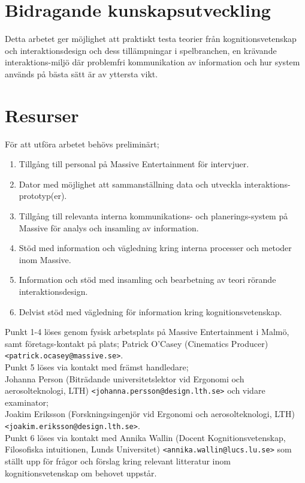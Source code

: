 \documentclass{article}
\begin{document}
\section*{Bidragande kunskapsutveckling}

  Detta arbetet ger möjlighet att praktiskt testa teorier från
  kognitionsvetenskap och interaktionsdesign och dess tillämpningar i
  spelbranchen, en krävande interaktions-miljö där problemfri kommunikation av
  information och hur system används på bästa sätt är av yttersta vikt.

\section*{Resurser}

  För att utföra arbetet behövs preliminärt;
  \begin{enumerate}
    \item{Tillgång till personal på Massive Entertainment för intervjuer.}
    \item{Dator med möjlighet att sammanställning data och utveckla
        interaktions-prototyp(er).}
    \item{Tillgång till relevanta interna kommunikations- och planerings-system
        på Massive för analys och insamling av information.}
    \item{Stöd med information och vägledning kring interna processer och
        metoder inom Massive.}
    \item{Information och stöd med insamling och bearbetning av teori rörande
        interaktionsdesign.}
    \item{Delvist stöd med vägledning för information kring
        kognitionsvetenskap.}
  \end{enumerate}

  Punkt 1-4 löses genom fysisk arbetsplats på Massive Entertainment i Malmö,
  samt företags-kontakt på plats; Patrick O'Casey (Cinematics Producer) \\
  \texttt{<patrick.ocasey@massive.se>}. \\

  Punkt 5 löses via kontakt med främst handledare; \\
  Johanna Person (Biträdande universitetslektor vid Ergonomi och
  aerosolteknologi, LTH) \texttt{<johanna.persson@design.lth.se>} och vidare
  examinator;
  \\Joakim Eriksson (Forskningsingenjör vid Ergonomi och aerosolteknologi, LTH)
  \texttt{<joakim.eriksson@design.lth.se>}. \\

  Punkt 6 löses via kontakt med Annika Wallin (Docent Kognitionsvetenskap,
  Filosofiska intuitionen, Lunds Universitet)
  \texttt{<annika.wallin@lucs.lu.se>} som ställt upp för frågor och förslag
  kring relevant litteratur inom kognitionsvetenskap om behovet uppstår.

	\printbibliography
\end{document}

